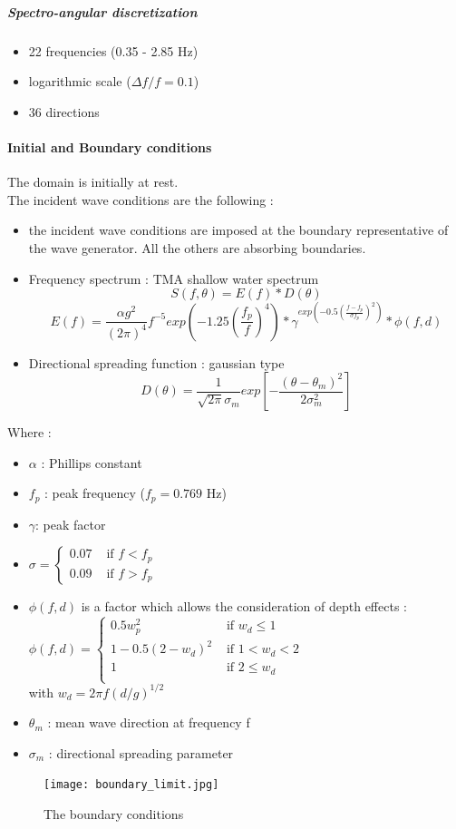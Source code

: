 \subparagraph{Spectro-angular discretization}
\begin{itemize}
\item 22 frequencies (0.35 - 2.85 Hz)
\item logarithmic scale ($\Delta f/f = 0.1$)
\item 36 directions
\end{itemize}

\paragraph{Initial and Boundary conditions}
The domain is initially at rest.\\
The incident wave conditions are the following :
\begin{itemize}
\item the incident wave conditions are imposed at the boundary representative of the wave generator. All the others are absorbing boundaries.
\item Frequency spectrum : TMA shallow water spectrum
\[S(f,\theta) = E(f)*D(\theta) \]
\[E(f) = \frac{\alpha g^2}{(2\pi)^4}f^{-5} exp(-1.25(\frac{f_p}{f})^{4})*\gamma^{exp(-0.5(\frac{f-f_p}{\sigma f_p})^{2})}*\phi (f,d)
\]
\item Directional spreading function : gaussian type
\[D(\theta) = \frac{1}{\sqrt{2\pi}\sigma _m}exp[-\frac{(\theta - \theta _m)^2}{2\sigma^2_m}]
\]
\end{itemize}
Where :\\
\begin{itemize}
\item $\alpha$ : Phillips constant
\item $f_p$ : peak frequency ($f_p = 0.769$ Hz)
\item $\gamma $: peak factor
\item $\sigma = \left\{ \begin{array}{rl}
 0.07 &\mbox{ if $f<f_p$} \\
  0.09 &\mbox{ if $f>f_p$}
       \end{array} \right.$
\item $\phi (f,d)$ is a factor which allows the consideration of depth effects :\\
$\phi (f,d) = \left\{ \begin{array}{rl}
 0.5 w^2_p &\mbox{ if $w_d\le 1$} \\
  1-0.5(2-w_d)^2 &\mbox{ if $1<w_d<2$}\\
  1 &\mbox{ if $2 \le w_d$} \\
       \end{array} \right.$\\
       with $w_d = 2\pi f(d/g)^{1/2}$
       \item$\theta _m$ : mean wave direction at frequency f
       \item $\sigma _m$ : directional spreading parameter
\end{itemize}
\begin{figure}[h!]
  \centering
    \texttt{[image: boundary\_limit.jpg]}
      \caption{The boundary conditions}
\end{figure}

